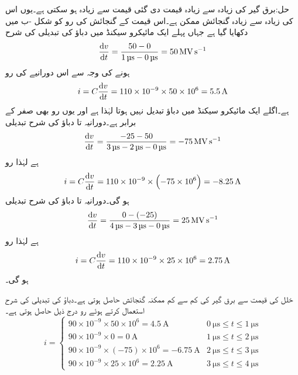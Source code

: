 حل:برق گیر کی زیادہ سے زیادہ قیمت دی گئی قیمت سے  زیادہ ہو سکتی ہے۔یوں اس کی زیادہ سے زیادہ گنجائش  ممکن ہے۔اس قیمت کے گنجائش کی رو کو شکل -ب میں دکھایا گیا ہے جہاں پہلے ایک مائیکرو سیکنڈ میں دباؤ کی تبدیلی کی شرح 
\begin{align*}
\frac{\dif v}{\dif t}=\frac{50-0}{\SI{1}{\micro\second}-\SI{0}{\micro\second}}=\SI{50}{\mega \volt \per\second}
\end{align*} 
ہونے کی وجہ سے اس دورانیے کی رو
\begin{align*}
i=C \frac{\dif v}{\dif t}=110 \times 10^{-9} \times 50 \times 10^{6}=\SI{5.5}{\ampere}
\end{align*}
ہے۔اگلے ایک مائیکرو سیکنڈ میں دباؤ تبدیل نہیں ہوتا لہٰذا  ہے اور یوں رو بھی صفر کے برابر ہے۔دورانیہ  تا   دباؤ کی شرح تبدیلی
\begin{align*}
\frac{\dif v}{\dif t}=\frac{-25-50}{\SI{3}{\micro\second}-\SI{2}{\micro\second}-\SI{0}{\micro\second}}=\SI{-75}{\mega \volt \per\second}
\end{align*}
ہے لہٰذا رو
\begin{align*}
i=C \frac{\dif v}{\dif t}=110 \times 10^{-9} \times \left(-75 \times 10^{6}\right)=\SI{-8.25}{\ampere}
\end{align*}
ہو گی۔دورانیہ  تا   دباؤ کی شرح تبدیلی
\begin{align*}
\frac{\dif v}{\dif t}=\frac{0-(-25)}{\SI{4}{\micro\second}-\SI{3}{\micro\second}-\SI{0}{\micro\second}}=\SI{25}{\mega \volt \per\second}
\end{align*}
ہے لہٰذا رو
\begin{align*}
i=C \frac{\dif v}{\dif t}=110 \times 10^{-9} \times 25\times 10^{6}=\SI{2.75}{\ampere}
\end{align*}
ہو گی۔

خلل کی قیمت سے برق گیر کی کم سے کم ممکنہ گنجائش  حاصل ہوتی ہے۔دباؤ کی تبدیلی کی شرح استعمال کرتے ہوئے رو درج ذیل حاصل ہوتی ہے۔
\begin{equation*}
i=
\begin{cases}
90 \times 10^{-9} \times 50 \times 10^{6}=\SI{4.5}{\ampere} & \SI{0}{\micro\second} \le t \le \SI{1}{\micro\second}\\
90 \times 10^{-9} \times 0=\SI{0}{\ampere} & \SI{1}{\micro\second} \le t \le \SI{2}{\micro\second}\\
90 \times 10^{-9} \times (-75) \times 10^{6}=\SI{-6.75}{\ampere} & \SI{2}{\micro\second}  \le t \le \SI{3}{\micro\second}\\
90 \times 10^{-9} \times 25 \times 10^{6}=\SI{2.25}{\ampere} & \SI{3}{\micro\second}  \le t \le \SI{4}{\micro\second}
\end{cases}
\end{equation*}

